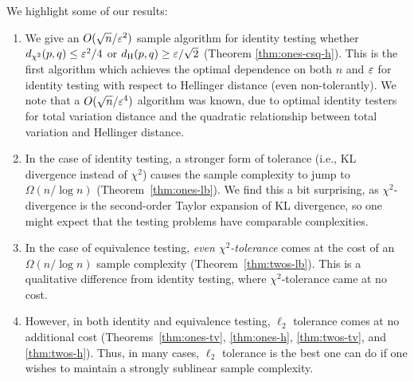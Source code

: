 We highlight some of our results:
\begin{enumerate}
\item We give an $O(\sqrt{n}/\varepsilon^2)$ sample algorithm for identity testing whether $d_{\chi^2}(p,q) \leq \varepsilon^2/4$ or $d_{\mathrm {H}}(p,q) \geq \varepsilon/\sqrt{2}$ (Theorem \ref{thm:ones-csq-h}).
This is the first algorithm which achieves the optimal dependence on both $n$ and $\varepsilon$ for identity testing with respect to Hellinger distance (even non-tolerantly).
We note that a $O(\sqrt{n}/\varepsilon^4)$ algorithm was known, due to optimal identity testers for total variation distance and the quadratic relationship between total variation and Hellinger distance.
\item In the case of identity testing, a stronger form of tolerance (i.e., KL divergence instead of $\chi^2$) causes the sample complexity to jump to $\Omega\left(n/\log n\right)$ (Theorem~\ref{thm:ones-lb}).
We find this a bit surprising, as $\chi^2$-divergence is the second-order Taylor expansion of KL divergence, so one might expect that the testing problems have comparable complexities.
\item In the case of equivalence testing, \emph{even $\chi^2$-tolerance} comes at the cost of an $\Omega\left(n/\log n\right)$ sample complexity (Theorem~\ref{thm:twos-lb}).
This is a qualitative difference from identity testing, where $\chi^2$-tolerance came at no cost.
\item However, in both identity and equivalence testing, $\ell_2$ tolerance comes at no additional cost (Theorems~\ref{thm:ones-tv}, \ref{thm:ones-h}, \ref{thm:twos-tv}, and \ref{thm:twos-h}).
Thus, in many cases, $\ell_2$ tolerance is the best one can do if one wishes to maintain a strongly sublinear sample complexity.
\end{enumerate}

